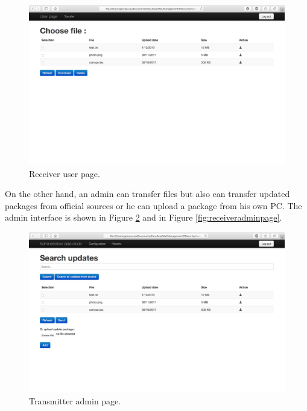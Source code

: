 \documentclass[a4paper,10pt]{article}
\begin{document}
\begin{figure}[!h]
\centering
\includegraphics[scale=0.35]{images/userreceiver.png}
\caption{Receiver user page.}
\label{fig:receiveruserpage}
\end{figure}

On the other hand, an admin can transfer files but also can transfer updated packages from official sources or he can upload a package from his own PC. The admin interface is shown in Figure \ref{fig:transadminpage}
and in Figure \ref{fig:receiveradminpage}.
\begin{figure}[!h]
\centering
\includegraphics[scale=0.35]{images/admintransmitter.png}
\caption{Transmitter admin page.}
\label{fig:transadminpage}
\end{figure}
\end{document}
